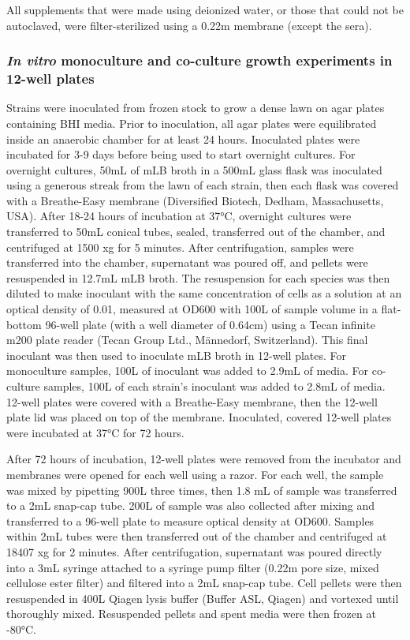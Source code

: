 \documentclass[11pt,onecolumn,notitlepage,openany,twoside]{book}
\begin{document}
\begin{refsection}
All supplements that were made using deionized water, or those that could not be autoclaved, were filter-sterilized using a 0.22{\textmu}m membrane (except the sera).

\subsubsection{\textit{In vitro} monoculture and co-culture growth experiments in 12-well plates}

Strains were inoculated from frozen stock to grow a dense lawn on agar plates containing BHI media. Prior to inoculation, all agar plates were equilibrated inside an anaerobic chamber for at least 24 hours. Inoculated plates were incubated for 3-9 days before being used to start overnight cultures. For overnight cultures, 50mL of mLB broth in a 500mL glass flask was inoculated using a generous streak from the lawn of each strain, then each flask was covered with a Breathe-Easy membrane (Diversified Biotech, Dedham, Massachusetts, USA). After 18-24 hours of incubation at 37°C, overnight cultures were transferred to 50mL conical tubes, sealed, transferred out of the chamber, and centrifuged at 1500 xg for 5 minutes. After centrifugation, samples were transferred into the chamber, supernatant was poured off, and pellets were resuspended in 12.7mL mLB broth. The resuspension for each species was then diluted to make inoculant with the same concentration of cells as a solution at an optical density of 0.01, measured at OD600 with 100{\textmu}L of sample volume in a flat-bottom 96-well plate (with a well diameter of 0.64cm) using a Tecan infinite m200 plate reader (Tecan Group Ltd., Männedorf, Switzerland). This final inoculant was then used to inoculate mLB broth in 12-well plates. For monoculture samples, 100{\textmu}L of inoculant was added to 2.9mL of media. For co-culture samples, 100{\textmu}L of each strain’s inoculant was added to 2.8mL of media. 12-well plates were covered with a Breathe-Easy membrane, then the 12-well plate lid was placed on top of the membrane. Inoculated, covered 12-well plates were incubated at 37°C for 72 hours.

After 72 hours of incubation, 12-well plates were removed from the incubator and membranes were opened for each well using a razor. For each well, the sample was mixed by pipetting 900{\textmu}L three times, then 1.8 mL of sample was transferred to a 2mL snap-cap tube. 200{\textmu}L of sample was also collected after mixing and transferred to a 96-well plate to measure optical density at OD600. Samples within 2mL tubes were then transferred out of the chamber and centrifuged at 18407 xg for 2 minutes. After centrifugation, supernatant was poured directly into a 3mL syringe attached to a syringe pump filter (0.22{\textmu}m pore size, mixed cellulose ester filter) and filtered into a 2mL snap-cap tube. Cell pellets were then resuspended in 400{\textmu}L Qiagen lysis buffer (Buffer ASL, Qiagen) and vortexed until thoroughly mixed. Resuspended pellets and spent media were then frozen at -80°C.


\end{refsection}
\end{document}
